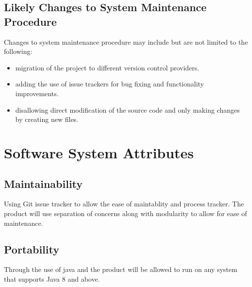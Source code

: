 \documentclass{article}
\begin{document}
\subsection{Likely Changes to System Maintenance Procedure}
Changes to system maintenance procedure may include but are not limited to the following:
\begin{itemize}
    \item migration of the project to different version control providers.
    \item adding the use of issue trackers for bug fixing and functionality improvements.
    \item disallowing direct modification of the source code and only making changes by creating new files.
\end{itemize}




\section{Software System Attributes}
\subsection{Maintainability}
Using Git issue tracker to allow the ease of maintablity and process tracker. The product will use separation of concerns along with modularity to allow for ease of maintenance.
\subsection{Portability}
Through the use of java and the product will be allowed to run on any system that supports Java 8 and above.
\end{document}
